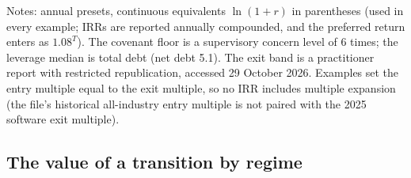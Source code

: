 \begin{table}[t]
\smallskip
\begin{minipage}{0.97\linewidth}\scriptsize
Notes: annual presets, continuous equivalents $\ln(1+r)$ in parentheses (used in every example; IRRs are reported annually compounded, and the preferred return enters as $1.08^T$). The covenant floor is a supervisory concern level of 6 times; the leverage median is total debt (net debt 5.1). The exit band is a practitioner report with restricted republication, accessed 29 October 2026. Examples set the entry multiple equal to the exit multiple, so no IRR includes multiple expansion (the file's historical all-industry entry multiple is not paired with the 2025 software exit multiple).
\end{minipage}
\end{table}

\subsection{The value of a transition by regime}\label{sec:regimes-value}


